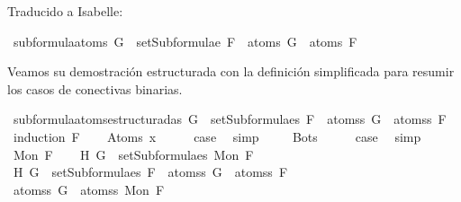 \begin{isabellebody}
\begin{isamarkuptext}
Traducido a Isabelle:%
\end{isamarkuptext}\isamarkuptrue%
\isamarkupfalse%
\ subformula{\isacharunderscore}atoms{\isacharcolon}\ {\isachardoublequoteopen}G\ {\isasymin}\ setSubformulae\ F\ {\isasymLongrightarrow}\ atoms\ G\ {\isasymsubseteq}\ atoms\ F{\isachardoublequoteclose}\isanewline
%
\isadelimproof
\ \ %
\endisadelimproof
%
\isatagproof
{}\isamarkupfalse%
%
\endisatagproof
{\isafoldproof}%
%
\isadelimproof
%
\endisadelimproof
%
\begin{isamarkuptext}%
Veamos su demostración estructurada con la definición simplificada para resumir los casos
de conectivas binarias.%
\end{isamarkuptext}\isamarkuptrue%
\isamarkupfalse%
\ subformula{\isacharunderscore}atoms{\isacharunderscore}estructurada{\isacharunderscore}s{\isacharcolon}\ {\isachardoublequoteopen}G\ {\isasymin}\ setSubformulae{\isacharunderscore}s\ F\ {\isasymLongrightarrow}\ atoms{\isacharunderscore}s\ G\ {\isasymsubseteq}\ atoms{\isacharunderscore}s\ F{\isachardoublequoteclose}\isanewline
%
\isadelimproof
%
\endisadelimproof
%
\isatagproof
{}\isamarkupfalse%
\ {\isacharparenleft}induction\ F{\isacharparenright}\isanewline
\ \ \isamarkupfalse%
\ {\isacharparenleft}Atom{\isacharunderscore}s\ x{\isacharparenright}\isanewline
\ \ \isamarkupfalse%
\ \isamarkupfalse%
\ {\isacharquery}case\ \isamarkupfalse%
\ simp\ \isanewline
{}\isamarkupfalse%
\isanewline
\ \ \isamarkupfalse%
\ Bot{\isacharunderscore}s\isanewline
\ \ \isamarkupfalse%
\ \isamarkupfalse%
\ {\isacharquery}case\ \isamarkupfalse%
\ simp\isanewline
{}\isamarkupfalse%
\isanewline
\ \ \isamarkupfalse%
\ {\isacharparenleft}Mon\ F{\isacharparenright}\isanewline
\ \ \isamarkupfalse%
\ H{}{\isacharcolon}\ {\isachardoublequoteopen}G\ {\isasymin}\ setSubformulae{\isacharunderscore}s\ {\isacharparenleft}Mon\ F{\isacharparenright}{\isachardoublequoteclose}\isanewline
\ \ \isamarkupfalse%
\ H{}{\isacharcolon}\ {\isachardoublequoteopen}G\ {\isasymin}\ setSubformulae{\isacharunderscore}s\ F\ {\isasymLongrightarrow}\ atoms{\isacharunderscore}s\ G\ {\isasymsubseteq}\ atoms{\isacharunderscore}s\ F{\isachardoublequoteclose}\isanewline
\ \ \isamarkupfalse%
\ {\isachardoublequoteopen}atoms{\isacharunderscore}s\ G\ {\isasymsubseteq}\ atoms{\isacharunderscore}s\ {\isacharparenleft}Mon\ F{\isacharparenright}{\isachardoublequoteclose}\isanewline

\end{isabellebody}
